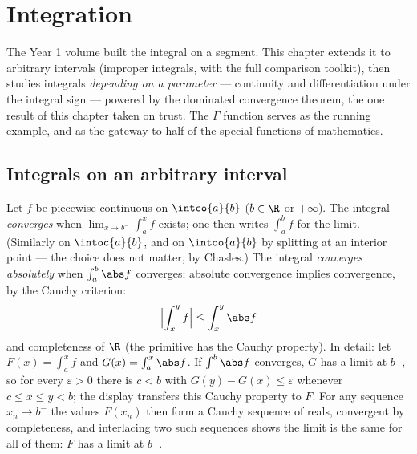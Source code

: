 \chapter{Integration}\label{ch:b2:integration}

The Year 1 volume built the integral on a segment. This chapter
extends it to arbitrary intervals (improper integrals, with the full
comparison toolkit), then studies integrals \emph{depending on a
parameter} --- continuity and differentiation under the integral
sign --- powered by the dominated convergence theorem, the one
result of this chapter taken on trust. The $\Gamma$ function serves
as the running example, and as the gateway to half of the special
functions of mathematics.

\section{Integrals on an arbitrary interval}

\begin{definition}\label{def:b2:integration:improper}
Let $f$ be piecewise continuous on $\intco{a}{b}$ ($b \in \R$ or
$+\infty$). The integral \emph{converges}
when $\lim_{x \to b^-} \int_a^x f$ exists; one then writes
$\int_a^b f$ for the limit. (Similarly on $\intoc{a}{b}$, and on
$\intoo{a}{b}$ by splitting at an interior point --- the choice does
not matter, by Chasles.) The integral \emph{converges absolutely}
when $\int_a^b \abs f$ converges; absolute convergence implies
convergence, by the Cauchy criterion:
\[
\Bigl| \int_x^{y} f \Bigr| \leq \int_x^{y} \abs f
\]
and completeness of $\R$ (the primitive has the Cauchy property).
In detail: let $F(x) = \int_a^x f$ and $G(x) = \int_a^x \abs
f$. If $\int^b\abs f$ converges, $G$ has a limit at $b^-$, so
for every $\varepsilon > 0$ there is $c < b$ with $G(y) - G(x)
\leq \varepsilon$ whenever $c \leq x \leq y < b$; the display
transfers this Cauchy property to $F$. For any sequence $x_n
\to b^-$ the values $F(x_n)$ then form a Cauchy sequence of
reals, convergent by completeness, and interlacing two such
sequences shows the limit is the same for all of them: $F$ has
a limit at $b^-$.
\end{definition}

